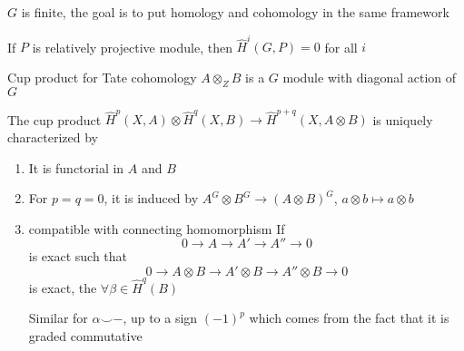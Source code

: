\documentclass[main]{subfiles}
\begin{document}
$G$ is finite, the goal is to put homology and cohomology in the same framework

\begin{fact}
If $P$ is relatively projective module, then $\hat H^i(G,P)=0$ for all $i$
\end{fact}

Cup product for Tate cohomology
$A\otimes_Z B$ is a $G$ module with diagonal action of $G$

The cup product $\hat H^p(X,A)\otimes\hat H^q(X,B)\to\hat H^{p+q}(X,A\otimes B)$ is uniquely characterized by
\begin{enumerate}
\item It is functorial in $A$ and $B$
\item For $p=q=0$, it is induced by $A^G\otimes B^G\to (A\otimes B)^G$, $a\otimes b\mapsto a\otimes b$
\item compatible with connecting homomorphism
If 
\[0\to A\to A'\to A''\to0\]
is exact such that
\[0\to A\otimes B\to A'\otimes B\to A''\otimes B\to0\]
is exact, the $\forall\beta\in\hat H^q(B)$
\begin{center}
\end{center}
Similar for $\alpha\smile-$, up to a sign $(-1)^p$ which comes from the fact that it is graded commutative
\end{enumerate}
\end{document}
